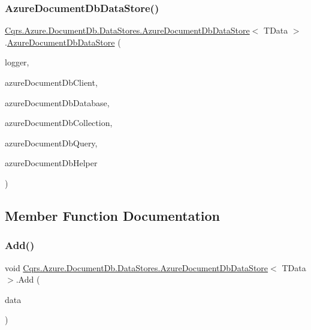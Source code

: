 \subsubsection{\texorpdfstring{Azure\+Document\+Db\+Data\+Store()}{AzureDocumentDbDataStore()}}
{\footnotesize\ttfamily \hyperlink{classCqrs_1_1Azure_1_1DocumentDb_1_1DataStores_1_1AzureDocumentDbDataStore}{Cqrs.\+Azure.\+Document\+Db.\+Data\+Stores.\+Azure\+Document\+Db\+Data\+Store}$<$ T\+Data $>$.\hyperlink{classCqrs_1_1Azure_1_1DocumentDb_1_1DataStores_1_1AzureDocumentDbDataStore}{Azure\+Document\+Db\+Data\+Store} (\begin{DoxyParamCaption}\item[{I\+Logger}]{logger,  }\item[{Document\+Client}]{azure\+Document\+Db\+Client,  }\item[{Database}]{azure\+Document\+Db\+Database,  }\item[{Document\+Collection}]{azure\+Document\+Db\+Collection,  }\item[{I\+Ordered\+Queryable$<$ T\+Data $>$}]{azure\+Document\+Db\+Query,  }\item[{\hyperlink{interfaceCqrs_1_1Azure_1_1DocumentDb_1_1IAzureDocumentDbHelper}{I\+Azure\+Document\+Db\+Helper}}]{azure\+Document\+Db\+Helper }\end{DoxyParamCaption})}



\subsection{Member Function Documentation}
\mbox{\label{classCqrs_1_1Azure_1_1DocumentDb_1_1DataStores_1_1AzureDocumentDbDataStore_ad17e6e846430e617af24be48b77d1528}} 
\subsubsection{\texorpdfstring{Add()}{Add()}\hspace{0.1cm}{\footnotesize\ttfamily [1/2]}}
{\footnotesize\ttfamily void \hyperlink{classCqrs_1_1Azure_1_1DocumentDb_1_1DataStores_1_1AzureDocumentDbDataStore}{Cqrs.\+Azure.\+Document\+Db.\+Data\+Stores.\+Azure\+Document\+Db\+Data\+Store}$<$ T\+Data $>$.Add (\begin{DoxyParamCaption}\item[{T\+Data}]{data }\end{DoxyParamCaption})}



